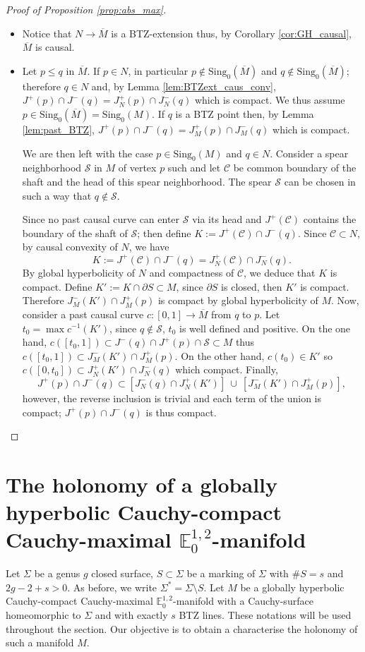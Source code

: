 \documentclass[a4paper,12pt]{article}
\def\C{\mathcal C}
\def\S{\mathcal S}
\def\S{\mathcal{S}}
\def\sing{\mathrm{Sing}}
\newcommand{\mass}[1]{{\mathbb E}^{1,2}_{#1}}
\begin{document}
\begin{proof}[Proof of Proposition \ref{prop:abs_max}]
 
 \begin{itemize}
  \item Notice that $N\rightarrow \overline M$ is a BTZ-extension thus, by Corollary \ref{cor:GH_causal}, $\overline M$ is causal. 
  \item Let $p\leq q$ in $\overline M$. If $p\in N$, in particular $p\notin \sing_0(\overline M)$ and $q\notin \sing_0(\overline M)$; therefore $q\in N$ and, by Lemma \ref{lem:BTZext_caus_conv},
$J^+(p)\cap J^-(q) = J^+_N(p) \cap J^-_N(q)$ which is compact. 
We thus assume $p\in \sing_0(\overline M)=\sing_0(M)$. If $q$ is a BTZ point then, by Lemma \ref{lem:past_BTZ}, $J^+(p)\cap J^-(q) = J^+_M(p) \cap J^-_M(q)$ which is compact.

 We are then left with the case $p\in \sing_0(M)$ and $q\in N$. 
Consider a spear neighborhood $\mathcal S$ in $M$ of vertex $p$ such and let $\mathcal C$ be common boundary of the shaft and the head of this spear neighborhood. The spear $\S$ can be chosen in such a way that $q\notin \S$.

Since no past causal curve can enter $\S$ via its head and $J^+(\C)$ contains the boundary of the shaft of $\S$; then define $K := J^+(\mathcal C)\cap J^-(q)$. Since $\C\subset N$, by causal convexity of $N$, we have
 $$K := J^+(\mathcal C)\cap J^-(q)=J^+_{N}(\mathcal C)\cap J^-_{N}(q).$$ By global hyperbolicity of $N$ and compactness of $\C$, we deduce that $K$ is compact. Define $K':=K\cap \partial S\subset M$, since $\partial S$ is closed, then $K'$ is compact.   Therefore  $J^-_M(K')\cap J^+_M(p)$ is compact by global hyperbolicity of $M$. 
Now, consider a past causal curve $c:[0,1]\rightarrow \overline M$ from $q$ to $p$. Let $t_0 = \max c^{-1}(K')$, since $q\notin \S$, $t_0$ is well defined and positive.
On the one hand, $c([t_0,1])\subset J^-(q)\cap J^+(p)\cap \S\subset M$ thus 
$c([t_0,1]) \subset J^-_M(K')\cap J^+_M(p)$. On the other hand, $c(t_0)\in K'$ so $c([0,t_0])\subset J^+_N(K')\cap J^-_N(q)$ which compact.
Finally,
$$ J^+(p)\cap J^-(q) \subset \left[J^-_N(q)\cap J^+_N(K')\right] ~\cup~  \left[J^-_M( K' )\cap J^+_M(p)\right],$$
however, the reverse inclusion is trivial and
each term of the union is compact; $ J^+(p)\cap J^-(q) $ is thus compact. 
 \end{itemize}


\end{proof}


\section{The holonomy of a globally hyperbolic Cau\-chy-compact Cauchy-maximal $\mass{0}$-manifold}
\label{sec:holonomy}
Let $\Sigma$ be a genus $g$ closed surface, $S\subset \Sigma$ be a marking of $\Sigma$ with $\#S=s$ and $2g-2+s>0$. As before, we write $\Sigma^* = \Sigma \setminus S$. Let $M$ be a globally hyperbolic Cauchy-compact Cauchy-maximal $\mass{0}$-manifold with a Cauchy-surface homeomorphic to $\Sigma$ and with exactly $s$ BTZ lines. These notations will be used throughout the section. Our objective is to obtain a characterise the holonomy of such a manifold $M$.
\end{document}
